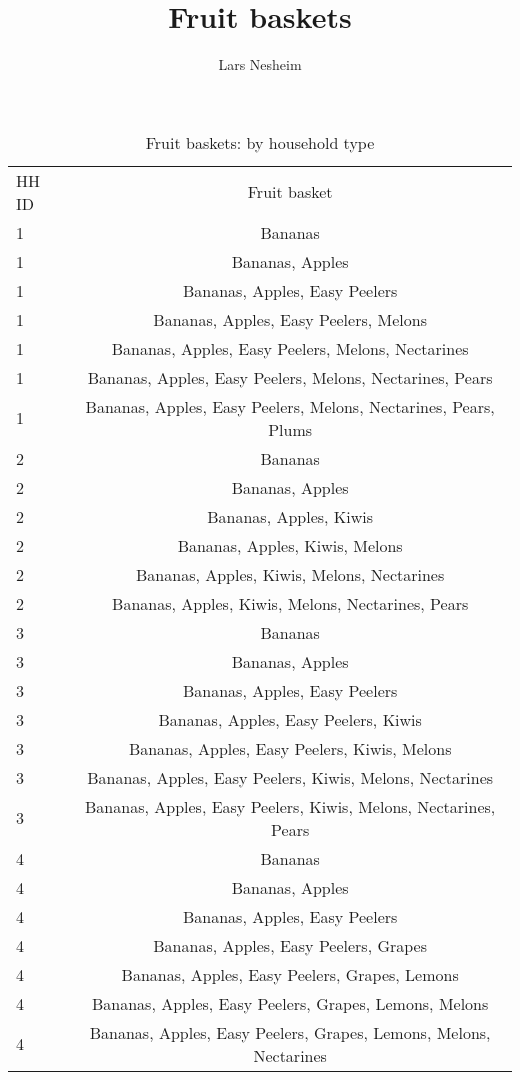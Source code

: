 \documentclass[11pt]{article}
\title{Fruit baskets}
\author{Lars Nesheim}
\date{}
\begin{document}
\maketitle
\begin{table}[h]
\caption{Fruit baskets: by household type}
\label{table:fruit baskets}
\begin{center}
\begin{tabular}{lc}
\hline \hline
HH ID & Fruit basket \\
1 & Bananas \\
1 & Bananas, Apples \\
1 & Bananas, Apples, Easy Peelers \\
1 & Bananas, Apples, Easy Peelers, Melons \\
1 & Bananas, Apples, Easy Peelers, Melons, Nectarines \\
1 & Bananas, Apples, Easy Peelers, Melons, Nectarines, Pears \\
1 & Bananas, Apples, Easy Peelers, Melons, Nectarines, Pears, Plums \\
2 & Bananas \\
2 & Bananas, Apples \\
2 & Bananas, Apples, Kiwis \\
2 & Bananas, Apples, Kiwis, Melons \\
2 & Bananas, Apples, Kiwis, Melons, Nectarines \\
2 & Bananas, Apples, Kiwis, Melons, Nectarines, Pears \\
3 & Bananas \\
3 & Bananas, Apples \\
3 & Bananas, Apples, Easy Peelers \\
3 & Bananas, Apples, Easy Peelers, Kiwis \\
3 & Bananas, Apples, Easy Peelers, Kiwis, Melons \\
3 & Bananas, Apples, Easy Peelers, Kiwis, Melons, Nectarines \\
3 & Bananas, Apples, Easy Peelers, Kiwis, Melons, Nectarines, Pears \\
4 & Bananas \\
4 & Bananas, Apples \\
4 & Bananas, Apples, Easy Peelers \\
4 & Bananas, Apples, Easy Peelers, Grapes \\
4 & Bananas, Apples, Easy Peelers, Grapes, Lemons \\
4 & Bananas, Apples, Easy Peelers, Grapes, Lemons, Melons \\
4 & Bananas, Apples, Easy Peelers, Grapes, Lemons, Melons, Nectarines \\

\end{tabular}
\end{center}
\end{table}
\end{document}
